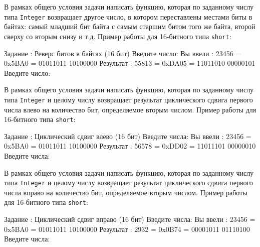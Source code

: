 
\begin{zztask}
В рамках общего условия задачи написать функцию, которая по заданному числу
типа \texttt{Integer} возвращает другое число, в котором переставлены
местами биты в байтах: самый младший бит байта с самым старшим битом того
же байта, второй сверху со вторым снизу и т.д.
Пример работы для 16-битного типа \texttt{short}:
\begin{zzoutput}
  Задание \thezztask: Реверс битов в байтах (16 бит)
  Введите число: 
  Вы ввели  : 23456 = 0x5BA0 = 01011011 10100000
  Результат : 55813 = 0xDA05 = 11011010 00000101
  Введите число: \zzuser{ }
\end{zzoutput}
\end{zztask}


\begin{zztask}
В рамках общего условия задачи написать функцию, которая по заданному числу
типа \texttt{Integer} и целому числу возвращает результат циклического
сдвига первого числа влево на количество бит, определяемое вторым числом.
Пример работы для 16-битного типа \texttt{short}:
\begin{zzoutput}
  Задание \thezztask: Циклический сдвиг влево (16 бит)
  Введите числа: 
  Вы ввели  : 23456 = 0x5BA0 = 01011011 10100000
  Результат : 56578 = 0xDD02 = 11011101 00000010
  Введите числа: \zzuser{ }
\end{zzoutput}
\end{zztask}


\begin{zztask}
В рамках общего условия задачи написать функцию, которая по заданному числу
типа \texttt{Integer} и целому числу возвращает результат циклического
сдвига первого числа вправо на количество бит, определяемое вторым числом.
Пример работы для 16-битного типа \texttt{short}:
\begin{zzoutput}
  Задание \thezztask: Циклический сдвиг вправо (16 бит)
  Введите числа: 
  Вы ввели  : 23456 = 0x5BA0 = 01011011 10100000
  Результат :  2932 = 0x0B74 = 00001011 01110100
  Введите числа: \zzuser{ }
\end{zzoutput}
\end{zztask}

